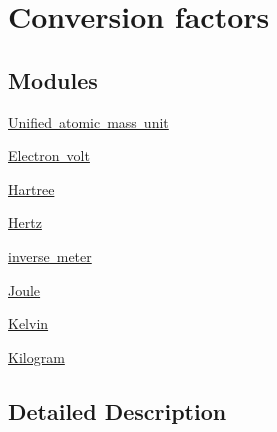 \hypertarget{group___n_i_s_t_const-_conversion_factors}{}\section{Conversion factors}
\label{group___n_i_s_t_const-_conversion_factors}
\subsection*{Modules}
\begin{DoxyCompactItemize}
\item 
\mbox{\hyperlink{group___n_i_s_t_const-_atomic_mass_unit}{Unified atomic mass unit}}
\item 
\mbox{\hyperlink{group___n_i_s_t_const-_electron_volt}{Electron volt}}
\item 
\mbox{\hyperlink{group___n_i_s_t_const-_hartree}{Hartree}}
\item 
\mbox{\hyperlink{group___n_i_s_t_const-_hertz}{Hertz}}
\item 
\mbox{\hyperlink{group___n_i_s_t_const-_inverse_meter}{inverse meter}}
\item 
\mbox{\hyperlink{group___n_i_s_t_const-_joule}{Joule}}
\item 
\mbox{\hyperlink{group___n_i_s_t_const-_kelvin}{Kelvin}}
\item 
\mbox{\hyperlink{group___n_i_s_t_const-_kilogram}{Kilogram}}
\end{DoxyCompactItemize}


\subsection{Detailed Description}
